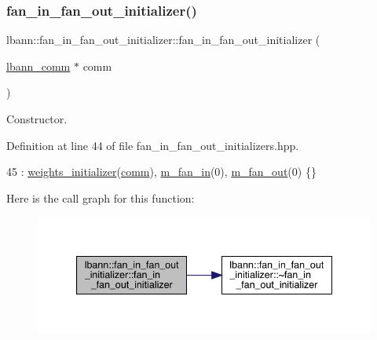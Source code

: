 \subsubsection{\texorpdfstring{fan\+\_\+in\+\_\+fan\+\_\+out\+\_\+initializer()}{fan\_in\_fan\_out\_initializer()}}
{\footnotesize\ttfamily lbann\+::fan\+\_\+in\+\_\+fan\+\_\+out\+\_\+initializer\+::fan\+\_\+in\+\_\+fan\+\_\+out\+\_\+initializer (\begin{DoxyParamCaption}\item[{\hyperlink{classlbann_1_1lbann__comm}{lbann\+\_\+comm} $\ast$}]{comm }\end{DoxyParamCaption})\hspace{0.3cm}{\ttfamily [inline]}}

Constructor. 

Definition at line 44 of file fan\+\_\+in\+\_\+fan\+\_\+out\+\_\+initializers.\+hpp.


\begin{DoxyCode}
45     : \hyperlink{classlbann_1_1weights__initializer_a3b65043cb6d76dcfcb07387392429755}{weights\_initializer}(\hyperlink{file__io_8cpp_ab048c6f9fcbcfaa57ce68b00263dbebe}{comm}), \hyperlink{classlbann_1_1fan__in__fan__out__initializer_aea6639db271d9050f0a2e4f8c8dfa6cd}{m\_fan\_in}(0), 
      \hyperlink{classlbann_1_1fan__in__fan__out__initializer_ac67d275ab8574780525d2af59b738338}{m\_fan\_out}(0) \{\}
\end{DoxyCode}
Here is the call graph for this function\+:\nopagebreak
\begin{figure}[H]
\begin{center}
\leavevmode
\includegraphics[width=340pt]{classlbann_1_1fan__in__fan__out__initializer_a3a3811af11b1a70a57af846ae2cdf668_cgraph}
\end{center}
\end{figure}
\mbox{\label{classlbann_1_1fan__in__fan__out__initializer_ab351750e3f776aa6748053f29d5d031c}} 
